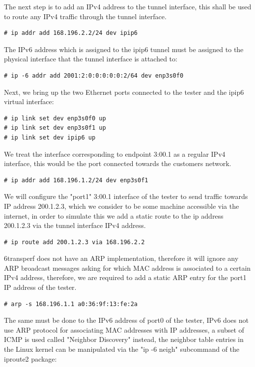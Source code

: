 \documentclass[a4paper,12p,titlepage]{article}
\begin{document}
The next step is to add an IPv4 address to the tunnel interface, this shall be used to route any IPv4 traffic through the tunnel interface.

\begin{lstlisting}
# ip addr add 168.196.2.2/24 dev ipip6
\end{lstlisting}

The IPv6 address which is assigned to the ipip6 tunnel must be assigned to the physical interface that the tunnel interface is attached to:

\begin{lstlisting}
# ip -6 addr add 2001:2:0:0:0:0:0:2/64 dev enp3s0f0
\end{lstlisting}

Next, we bring up the two Ethernet ports connected to the tester and the ipip6 virtual interface:

\begin{lstlisting}
# ip link set dev enp3s0f0 up
# ip link set dev enp3s0f1 up
# ip link set dev ipip6 up
\end{lstlisting}

We treat the interface corresponding to endpoint 3:00.1 as a regular IPv4 interface, this would be the port connected towards the customers network.

\begin{lstlisting}
# ip addr add 168.196.1.2/24 dev enp3s0f1
\end{lstlisting}

We will configure the "port1" 3:00.1 interface of the tester to send traffic towards IP address 200.1.2.3, which we consider to be some machine accessible via the internet, in order to simulate this we add a static route to the ip address 200.1.2.3 via the tunnel interface IPv4 address.

\begin{lstlisting}
# ip route add 200.1.2.3 via 168.196.2.2
\end{lstlisting}

6transperf does not have an ARP implementation, therefore it will ignore any ARP broadcast messages asking for which MAC address is associated to a certain IPv4 address, therefore, we are required to add a static ARP entry for the port1 IP address of the tester.


\begin{lstlisting}
# arp -s 168.196.1.1 a0:36:9f:13:fe:2a
\end{lstlisting}

The same must be done to the IPv6 address of port0 of the tester, IPv6 does not use ARP protocol for associating MAC addresses with IP addresses, a subset of ICMP is used called "Neighbor Discovery" instead, the neighbor table entries in the Linux kernel can be manipulated via the "ip -6 neigh" subcommand of the iproute2 package:
\end{document}
